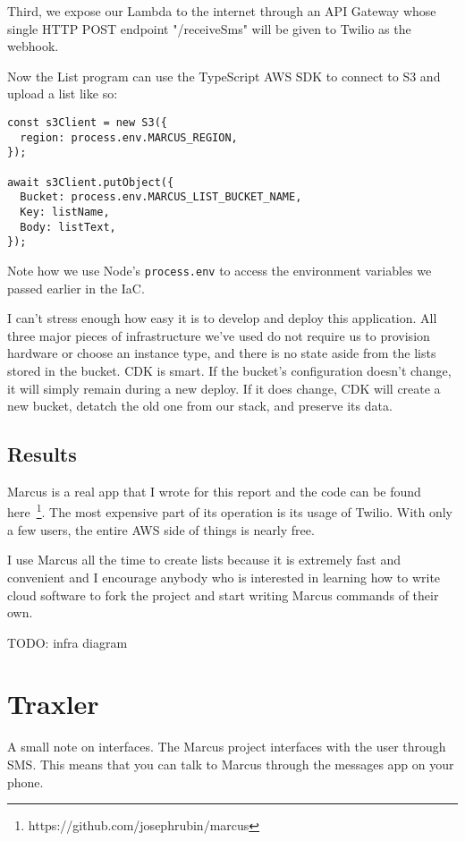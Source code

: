 \documentclass{article}
\begin{document}
Third, we expose our Lambda to the internet through an API Gateway whose single HTTP POST endpoint "/receiveSms" will be given to Twilio as the webhook.

Now the List program can use the TypeScript AWS SDK to connect to S3 and upload a list like so:

\begin{verbatim}
const s3Client = new S3({
  region: process.env.MARCUS_REGION,
});

await s3Client.putObject({
  Bucket: process.env.MARCUS_LIST_BUCKET_NAME,
  Key: listName,
  Body: listText,
});
\end{verbatim}

Note how we use Node's \texttt{process.env} to access the environment variables we passed earlier in the IaC.

I can't stress enough how easy it is to develop and deploy this application.
All three major pieces of infrastructure we've used do not require us to provision hardware or choose an instance type, and there is no state aside from the lists stored in the bucket.
CDK is smart.
If the bucket's configuration doesn't change, it will simply remain during a new deploy.
If it does change, CDK will create a new bucket, detatch the old one from our stack, and preserve its data.

\subsection{Results}

Marcus is a real app that I wrote for this report and the code can be found here~\footnote{https://github.com/josephrubin/marcus}.
The most expensive part of its operation is its usage of Twilio.
With only a few users, the entire AWS side of things is nearly free.

I use Marcus all the time to create lists because it is extremely fast and convenient and I encourage anybody who is interested in learning how to write cloud software to fork the project and start writing Marcus commands of their own.

TODO: infra diagram

\section{Traxler}

A small note on interfaces.
The Marcus project interfaces with the user through SMS.
This means that you can talk to Marcus through the messages app on your phone.
\end{document}
